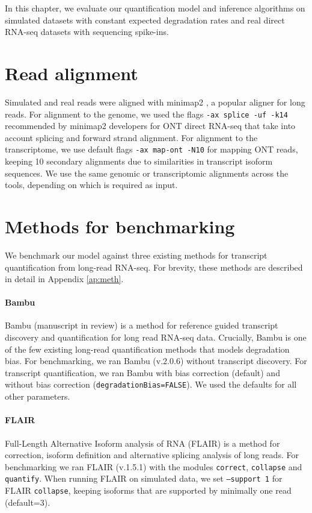 
In this chapter, we evaluate our quantification model and inference algorithms on simulated datasets with constant expected degradation rates and real direct RNA-seq datasets with sequencing spike-ins. 

\section{Read alignment}

Simulated and real reads were aligned with minimap2 \cite{Minimap2018, Minimap2021}, a popular aligner for long reads. For alignment to the genome, we used the flags \texttt{-ax splice -uf -k14} recommended by minimap2 developers for ONT direct RNA-seq that take into account splicing and forward strand alignment. For alignment to the transcriptome, we use default flags \texttt{-ax map-ont -N10} for mapping ONT reads, keeping 10 secondary alignments due to similarities in transcript isoform sequences. We use the same genomic or transcriptomic alignments across the tools, depending on which is required as input.   

\section{Methods for benchmarking}

We benchmark our model against three existing methods for transcript quantification from long-read RNA-seq. For brevity, these methods are described in detail in Appendix \ref{ap:meth}.

\paragraph{Bambu} Bambu (manuscript in review)\cite{Bambu2022} is a method for reference guided transcript discovery and quantification for long read RNA-seq data. Crucially, Bambu is one of the few existing long-read quantification methods that models degradation bias. For benchmarking, we ran Bambu (v.2.0.6) without transcript discovery. For transcript quantification, we ran Bambu with bias correction (default) and without bias correction (\texttt{degradationBias=FALSE}). We used the defaults for all other parameters.

\paragraph{FLAIR} Full-Length Alternative Isoform analysis of RNA (FLAIR) \cite{Tang2020} is a method for correction, isoform definition and alternative splicing analysis of long reads. For benchmarking we ran FLAIR (v.1.5.1) with the modules \texttt{correct}, \texttt{collapse} and \texttt{quantify}. When running FLAIR on simulated data, we set \texttt{--support 1} for FLAIR \texttt{collapse}, keeping isoforms that are supported by minimally one read (default=3).  

